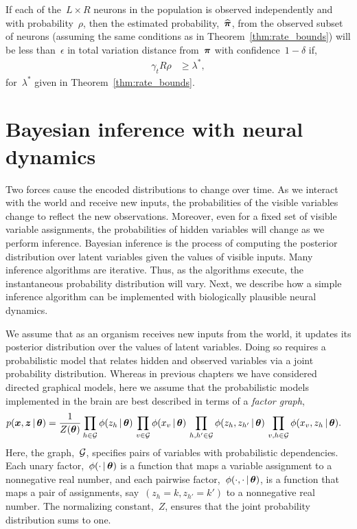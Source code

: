 \begin{corollary} 
  If each of the~$L \times R$ neurons in the population is observed 
  independently and with probability~$\rho$, then the estimated probability,~$\widehat{\boldsymbol{\pi}}$, 
  from the observed subset of neurons (assuming the same 
  conditions as in Theorem~\ref{thm:rate_bounds}) will be less 
  than~$\epsilon$ in total variation distance from~$\boldsymbol{\pi}$ 
  with confidence~$1-\delta$ if,
  \begin{align}
    \gamma_t R \rho &\geq \lambda^*,
  \end{align}
  for~$\lambda^*$ given in Theorem~\ref{thm:rate_bounds}.
\end{corollary}


\section{Bayesian inference with neural dynamics}
Two forces cause the encoded distributions to change over time. As
we interact with the world and receive new inputs, the probabilities
of the visible variables change to reflect the new
observations. Moreover, even for a fixed set of visible variable
assignments, the probabilities of hidden variables will change as we
perform inference. Bayesian inference is the process of computing the
posterior distribution over latent variables given the values of visible
inputs. Many inference algorithms are iterative. Thus, as the
algorithms execute, the instantaneous probability distribution will
vary. Next, we describe how a simple inference algorithm can be
implemented with biologically plausible neural dynamics.

We assume that as an organism receives new inputs from the world, it
updates its posterior distribution over the values of latent
variables. Doing so requires a probabilistic model that relates hidden
and observed variables via a joint probability distribution.  Whereas
in previous chapters we have considered directed graphical models,
here we assume that the probabilistic models implemented in the brain
are best described in terms of a \emph{factor graph},
\begin{align}
  \label{eq:probabilistic_model}
  p(\boldsymbol{x}, \boldsymbol{z} \,|\, \boldsymbol{\theta}) &=
  \frac{1}{Z(\boldsymbol{\theta})}
  \prod_{h \in \mathcal{G}} \phi(z_h \,|\, \boldsymbol{\theta}) \,
  \prod_{v \in \mathcal{G}} \phi(x_v \,|\, \boldsymbol{\theta}) \,
  \prod_{h,h' \in \mathcal{G}} \phi(z_h, z_{h'} \,|\, \boldsymbol{\theta}) \,
  \prod_{v,h \in \mathcal{G}} \phi(x_v, z_{h} \,|\, \boldsymbol{\theta}).
\end{align}
Here, the graph,~$\mathcal{G}$, specifies pairs of variables with
probabilistic dependencies.  Each unary factor,~$\phi(\cdot \,|\,
\boldsymbol{\theta})$ is a function that maps a variable assignment to a
nonnegative real number, and each pairwise factor,~$\phi(\cdot, \cdot
\,|\, \boldsymbol{\theta})$, is a function that maps a pair of assignments,
say~${(z_h=k, z_{h'}=k')}$ to a nonnegative real number. The
normalizing constant,~$Z$, ensures that the joint probability
distribution sums to one.

